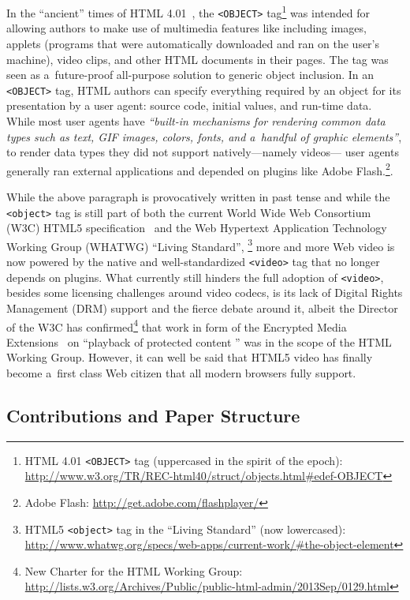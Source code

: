 \documentclass{sig-alternate}
\newcommand{\inlinelistingsize}{\fontsize{8pt}{11pt}}
\let\oldurl\url
\renewcommand{\url}[1]{\inlinelistingsize\oldurl{#1}}
\begin{document}
In the ``ancient'' times of HTML 4.01~\cite{raggett1999html401},
the \texttt{<OBJECT>} tag\footnote{HTML 4.01 \texttt{<OBJECT>} tag
(uppercased in the spirit of the epoch):
\url{http://www.w3.org/TR/REC-html40/struct/objects.html\#edef-OBJECT}}
was intended for allowing authors to make use of multimedia features
like including images, applets (programs that were automatically downloaded
and ran on the user's machine), video clips, and other HTML documents in their pages.
The tag was seen as a~future-proof all-purpose solution to generic object inclusion.
In an \texttt{<OBJECT>} tag, HTML authors can specify everything required
by an object for its presentation by a user agent:
source code, initial values, and run-time data.
While most user agents have \textit{``built-in mechanisms
for rendering common data types such as text, GIF images,
colors, fonts, and a~handful of graphic elements''},
to render data types they did not support natively---namely videos---%
user agents generally ran external applications and depended on plugins
like Adobe Flash.\footnote{Adobe Flash:
\url{http://get.adobe.com/flashplayer/}}.

While the above paragraph is provocatively written in past tense
and while the \texttt{<object>} tag is still part of both the current
World Wide Web Consortium (W3C) HTML5 specification~\cite{berjon2013html5}
and the Web Hypertext Application Technology Working Group
(WHATWG) ``Living Standard'',%
\footnote{HTML5 \texttt{<object>} tag in the ``Living Standard'' (now lowercased):
\url{http://www.whatwg.org/specs/web-apps/current-work/\#the-object-element}} 
more and more Web video is now powered by the native and well-standardized
\texttt{<video>} tag that no longer depends on plugins.
What currently still hinders the full adoption of \texttt{<video>},
besides some licensing challenges around video codecs,
is its lack of Digital Rights Management (DRM) support
and the fierce debate around it, albeit the Director of the W3C
has confirmed\footnote{New Charter for the HTML Working Group:
\url{http://lists.w3.org/Archives/Public/public-html-admin/2013Sep/0129.html}}
that work in form of the Encrypted Media Extensions~\cite{dorwin2013eme}
on ``playback of protected content '' was in the scope of the HTML Working Group.
However, it can well be said that
HTML5 video has finally become a~first class Web citizen
that all modern browsers fully support.

\subsection{Contributions and Paper Structure}
\end{document}
